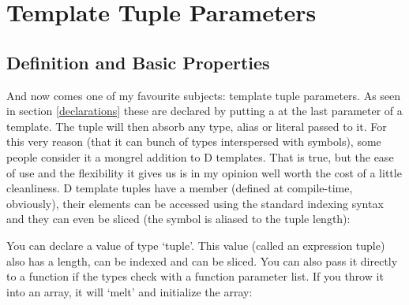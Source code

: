 \section{Template Tuple Parameters}\label{tuples}

\subsection{Definition and Basic Properties}\label{tupleproperties}

And now comes one of my favourite subjects: template tuple parameters. As seen in section \ref{declarations} these are declared by putting a  at the last parameter of a template. The tuple will then absorb any type, alias or literal passed to it. 
For this very reason (that it can bunch of types interspersed with symbols), some people consider it a mongrel addition to D templates. That is true, but the ease of use and the flexibility it gives us is in my opinion well worth the cost of a little cleanliness.
D template tuples have a  member (defined at compile-time, obviously), their elements can be accessed using the standard indexing syntax and they can even be sliced (the \DD{\$} symbol is aliased to the tuple length):


You can declare a value of type `tuple'. This value (called an expression tuple) also has a length, can be indexed and can be sliced. You can also pass it directly to a function if the types check with a function parameter list. If you throw it into an array, it will `melt' and initialize the array:



